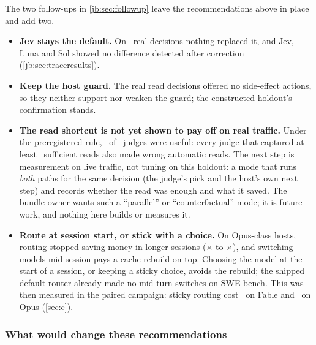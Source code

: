 The two follow-ups in \cref{jb:sec:followup} leave the recommendations above in place and add two.
\begin{itemize}
  \item \textbf{Jev stays the default.} On \TrN\ real decisions nothing replaced it, and Jev, Luna and Sol
    showed no difference detected after correction (\cref{jb:sec:traceresults}).
  \item \textbf{Keep the host guard.} The real read decisions offered no side-effect actions, so they
    neither support nor weaken the guard; the constructed holdout's confirmation stands.
  \item \textbf{The read shortcut is not yet shown to pay off on real traffic.} Under the preregistered
    rule, \TrNUseful\ of \NumBase\ judges were useful: every judge that captured at least
    \TrUsefulMinReads\ sufficient reads also made wrong automatic reads. The next step is measurement on
    live traffic, not tuning on this holdout: a mode that runs \emph{both} paths for the same decision
    (the judge's pick and the host's own next step) and records whether the read was enough and what it
    saved. The bundle owner wants such a ``parallel'' or ``counterfactual'' mode; it is future work, and
    nothing here builds or measures it.
  \item \textbf{Route at session start, or stick with a choice.} On Opus-class hosts, routing stopped
    saving money in longer sessions (\CaOpusRoutedOne$\times$ to \CaOpusRoutedFour$\times$), and switching
    models mid-session pays a cache rebuild on top. Choosing the model at the start of a session, or
    keeping a sticky choice, avoids the rebuild; the shipped default router already made no mid-turn
    switches on SWE-bench. This was then measured in the paired campaign: sticky routing cost \CfFableStickyPair\X\ on Fable and
    \CfOpusStickyPair\X\ on Opus (\cref{sec:c}).
\end{itemize}

\subsubsection{What would change these recommendations}

